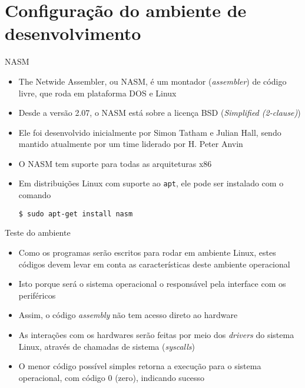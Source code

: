\section{Configuração do ambiente de desenvolvimento}

\begin{frame}[fragile]{NASM}

    \begin{itemize}
        \item The Netwide Assembler, ou NASM, é um montador (\textit{assembler}) de código livre,
            que roda em plataforma DOS e Linux

        \item Desde a versão 2.07, o NASM está sobre a licença BSD (\textit{Simplified (2-clause)})

        \item Ele foi desenvolvido inicialmente por Simon Tatham e Julian Hall, sendo mantido
            atualmente por um time liderado por H. Peter Anvin

        \item O NASM tem suporte para todas as arquiteturas x86

        \item Em distribuições Linux com suporte ao \texttt{apt}, ele pode ser instalado com o
        comando
        \begin{center}
            \verb|$ sudo apt-get install nasm|
        \end{center}
    \end{itemize}

\end{frame}

\begin{frame}[fragile]{Teste do ambiente}

    \begin{itemize}
        \item Como os programas serão escritos para rodar em ambiente Linux, estes códigos devem
            levar em conta as características deste ambiente operacional

        \item Isto porque será o sistema operacional o responsável pela interface com os
            periféricos

        \item Assim, o código \textit{assembly} não tem acesso direto ao hardware

        \item As interações com os hardwares serão feitas por meio dos \textit{drivers} do sistema
            Linux, através de chamadas de sistema (\textit{syscalls})

        \item O menor código possível simples retorna a execução para o sistema operacional, 
            com código 0 (zero), indicando sucesso 

    \end{itemize}

\end{frame}

